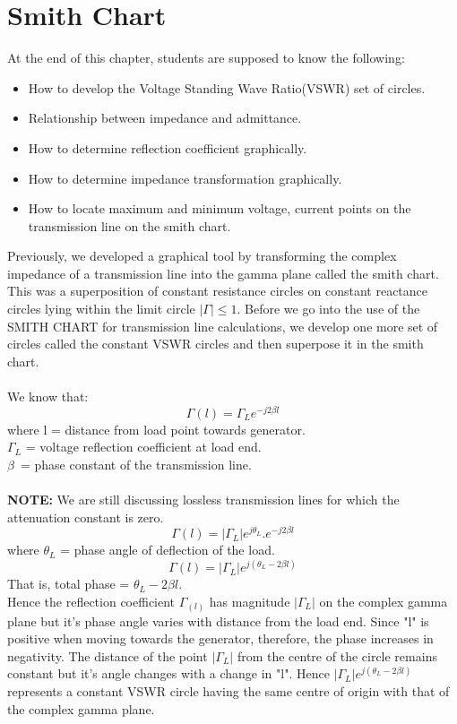 \chapter{Smith Chart}
\begin{center}
At the end of this chapter, students are supposed to know the following:
\end{center}
    
\begin{itemize}
\item How to develop the Voltage Standing Wave Ratio(VSWR) set of circles.
\item Relationship between impedance and admittance.
\item How to determine reflection coefficient graphically.
\item How to determine impedance transformation graphically.
\item How to locate maximum and minimum voltage, current points on the transmission line on the smith chart.
\end{itemize}
Previously, we developed a graphical tool by transforming the complex impedance of a transmission line into the gamma plane called the smith chart. This was a superposition of constant resistance circles on constant reactance circles lying within the limit circle $|\Gamma| \leq 1$. Before we go into the use of the SMITH CHART for transmission line calculations, we develop one more set of circles called the constant VSWR circles and then superpose it in the smith chart.\\\\ We know that:
\begin{equation*}
 \Gamma(l) =\Gamma_L e^{-j2\beta{l}}
\end{equation*}
where l = distance from load point towards generator.\\
$\Gamma_{L}$ = voltage reflection coefficient at load end.\\ 	
$\beta$\ = phase constant of the transmission line.\\\\
\textbf{NOTE:}	We are still discussing lossless transmission lines for which the attenuation constant is zero.
\begin{equation*}
\Gamma{(l)}=|\Gamma_{L}|e^{j\theta_L}.e^{-j2\beta l}
\end{equation*}
  where	$\theta_L$ = phase angle of deflection of the load.
\begin{equation}
\Gamma{(l)} =|\Gamma_L|e^{j(\theta_L - 2\beta{l})}
\end{equation}
That is, total phase = $\theta_L - 2\beta{l}$.\\
Hence the reflection coefficient $\Gamma_{(l)}$ has magnitude $|\Gamma_L|$ on the complex gamma plane but it's phase angle varies with distance from the load end. Since "l" is positive when moving towards the generator, therefore, the phase increases in negativity. The distance of the point $|\Gamma_L|$ from the centre of the circle remains constant but it's angle changes with a change in "l". Hence $|\Gamma_L|e^{j(\theta_L - 2\beta l)}$ represents a constant VSWR circle having the same centre of origin with that of the complex gamma plane.

